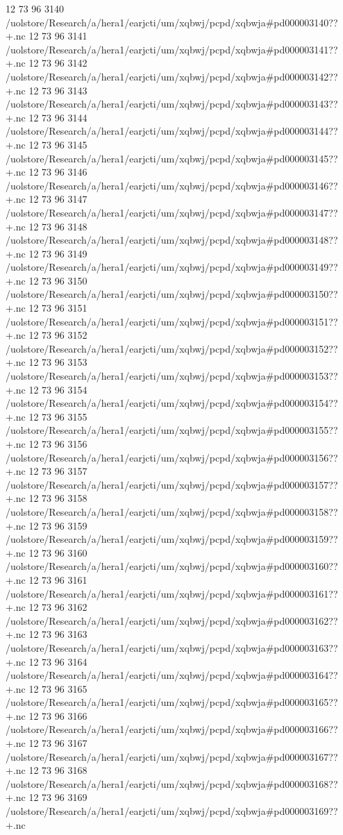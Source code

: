 12 73 96
3140
/uolstore/Research/a/hera1/earjcti/um/xqbwj/pcpd/xqbwja#pd000003140??+.nc
12 73 96
3141
/uolstore/Research/a/hera1/earjcti/um/xqbwj/pcpd/xqbwja#pd000003141??+.nc
12 73 96
3142
/uolstore/Research/a/hera1/earjcti/um/xqbwj/pcpd/xqbwja#pd000003142??+.nc
12 73 96
3143
/uolstore/Research/a/hera1/earjcti/um/xqbwj/pcpd/xqbwja#pd000003143??+.nc
12 73 96
3144
/uolstore/Research/a/hera1/earjcti/um/xqbwj/pcpd/xqbwja#pd000003144??+.nc
12 73 96
3145
/uolstore/Research/a/hera1/earjcti/um/xqbwj/pcpd/xqbwja#pd000003145??+.nc
12 73 96
3146
/uolstore/Research/a/hera1/earjcti/um/xqbwj/pcpd/xqbwja#pd000003146??+.nc
12 73 96
3147
/uolstore/Research/a/hera1/earjcti/um/xqbwj/pcpd/xqbwja#pd000003147??+.nc
12 73 96
3148
/uolstore/Research/a/hera1/earjcti/um/xqbwj/pcpd/xqbwja#pd000003148??+.nc
12 73 96
3149
/uolstore/Research/a/hera1/earjcti/um/xqbwj/pcpd/xqbwja#pd000003149??+.nc
12 73 96
3150
/uolstore/Research/a/hera1/earjcti/um/xqbwj/pcpd/xqbwja#pd000003150??+.nc
12 73 96
3151
/uolstore/Research/a/hera1/earjcti/um/xqbwj/pcpd/xqbwja#pd000003151??+.nc
12 73 96
3152
/uolstore/Research/a/hera1/earjcti/um/xqbwj/pcpd/xqbwja#pd000003152??+.nc
12 73 96
3153
/uolstore/Research/a/hera1/earjcti/um/xqbwj/pcpd/xqbwja#pd000003153??+.nc
12 73 96
3154
/uolstore/Research/a/hera1/earjcti/um/xqbwj/pcpd/xqbwja#pd000003154??+.nc
12 73 96
3155
/uolstore/Research/a/hera1/earjcti/um/xqbwj/pcpd/xqbwja#pd000003155??+.nc
12 73 96
3156
/uolstore/Research/a/hera1/earjcti/um/xqbwj/pcpd/xqbwja#pd000003156??+.nc
12 73 96
3157
/uolstore/Research/a/hera1/earjcti/um/xqbwj/pcpd/xqbwja#pd000003157??+.nc
12 73 96
3158
/uolstore/Research/a/hera1/earjcti/um/xqbwj/pcpd/xqbwja#pd000003158??+.nc
12 73 96
3159
/uolstore/Research/a/hera1/earjcti/um/xqbwj/pcpd/xqbwja#pd000003159??+.nc
12 73 96
3160
/uolstore/Research/a/hera1/earjcti/um/xqbwj/pcpd/xqbwja#pd000003160??+.nc
12 73 96
3161
/uolstore/Research/a/hera1/earjcti/um/xqbwj/pcpd/xqbwja#pd000003161??+.nc
12 73 96
3162
/uolstore/Research/a/hera1/earjcti/um/xqbwj/pcpd/xqbwja#pd000003162??+.nc
12 73 96
3163
/uolstore/Research/a/hera1/earjcti/um/xqbwj/pcpd/xqbwja#pd000003163??+.nc
12 73 96
3164
/uolstore/Research/a/hera1/earjcti/um/xqbwj/pcpd/xqbwja#pd000003164??+.nc
12 73 96
3165
/uolstore/Research/a/hera1/earjcti/um/xqbwj/pcpd/xqbwja#pd000003165??+.nc
12 73 96
3166
/uolstore/Research/a/hera1/earjcti/um/xqbwj/pcpd/xqbwja#pd000003166??+.nc
12 73 96
3167
/uolstore/Research/a/hera1/earjcti/um/xqbwj/pcpd/xqbwja#pd000003167??+.nc
12 73 96
3168
/uolstore/Research/a/hera1/earjcti/um/xqbwj/pcpd/xqbwja#pd000003168??+.nc
12 73 96
3169
/uolstore/Research/a/hera1/earjcti/um/xqbwj/pcpd/xqbwja#pd000003169??+.nc
